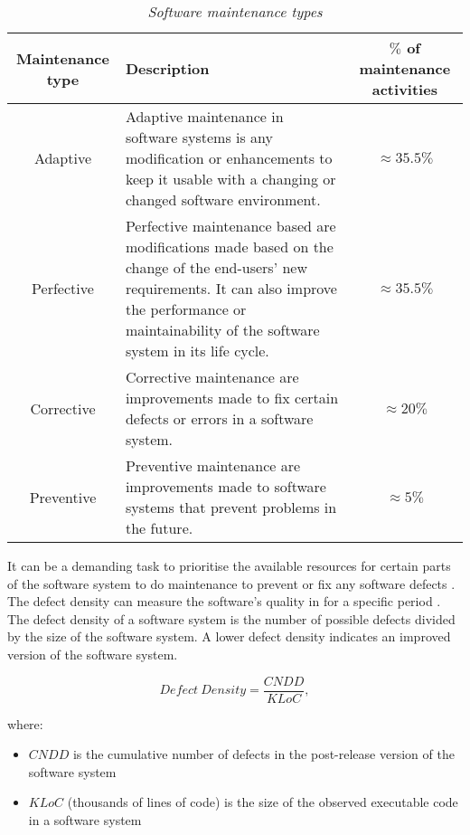 \begin{table}[!htb]
	\centering
	\caption[Software maintenance types]
	{\textit{Software maintenance types \cite{Ping2010,Hasan2012,Mamone1994}}}
	\label{tbl:CH1_MaintenanceTypes}
	\begin{tabularx}{\textwidth}{|c|X|c|}
		\hline
		\textbf{Maintenance type} & \textbf{Description} & \textbf{$\%$ of maintenance activities} \\ \hline
		Adaptive & \raggedright Adaptive maintenance in software systems is any modification or enhancements to keep it usable with a changing or changed software environment. & $\approx 35.5\%$ \\ \hline
		Perfective & Perfective maintenance based are modifications made based on the change of the end-users' new requirements. It can also improve the performance or maintainability of the software system in its life cycle. & $\approx 35.5\%$ \\ \hline
		Corrective & \raggedright Corrective maintenance are improvements made to fix certain defects or errors in a software system. & $\approx 20\%$ \\ \hline
		Preventive & \raggedright  Preventive maintenance are improvements made to software systems that prevent problems in the future. & $\approx 5\%$ \\ \hline
	\end{tabularx}
\end{table}

It can be a demanding task to prioritise the available resources for certain parts of the software system to do maintenance to prevent or fix any software defects \cite{Mamone1994, Hasan2012}. The defect density can measure the software's quality in  for a specific period \cite{Shah2012, Alenezi2016}. The defect density of a software system is the number of possible defects divided by the size of the software system.  A lower defect density indicates an improved version of the software system.

\begin{equation}
	\label{eq:Defect_Density}
	Defect~Density = \frac{CNDD}{KLoC},
\end{equation}

where:

\begin{itemize}
	\item $CNDD$ is the cumulative number of defects in the post-release version of the software system
	\item $KLoC$ (thousands of lines of code) is the size of the observed executable code in a software system 
\end{itemize}

